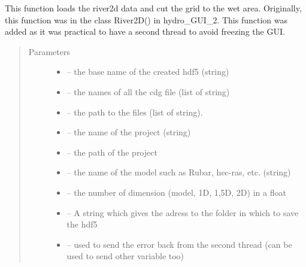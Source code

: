\documentclass[letterpaper,10pt,english]{sphinxmanual}
\begin{document}
\begin{fulllineitems}
\label{\detokenize{index:src.river2d.load_river2d_and_cut_grid}}
This function loads the river2d data and cut the grid to the wet area. Originally, this function was in the class
River2D() in hydro\_GUI\_2. This function was added as it was practical to have a second thread to avoid freezing
the GUI.
\begin{quote}\begin{description}
\item[{Parameters}] \leavevmode\begin{itemize}
\item {} 
 -- the base name of the created hdf5 (string)

\item {} 
 -- the names of all the cdg file (list of string)

\item {} 
 -- the path to the files (list of string).

\item {} 
 -- the name of the project (string)

\item {} 
 -- the path of the project

\item {} 
 -- the name of the model such as Rubar, hec-ras, etc. (string)

\item {} 
 -- the number of dimension (model, 1D, 1,5D, 2D) in a float

\item {} 
 -- A string which gives the adress to the folder in which to save the hdf5

\item {} 
 -- used to send the error back from the second thread (can be used to send other variable too)

\end{itemize}

\end{description}\end{quote}

\end{fulllineitems}
\end{document}
